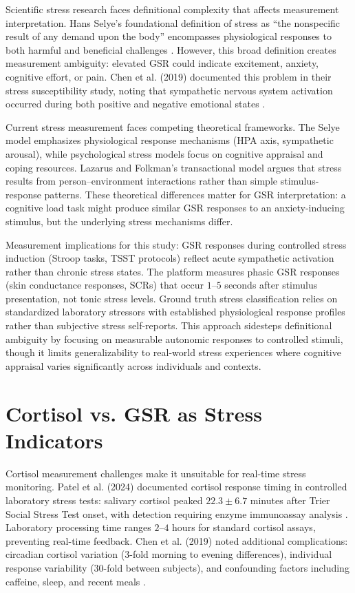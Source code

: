 \documentclass{report}
\begin{document}
Scientific stress research faces definitional complexity that affects measurement interpretation. Hans Selye's foundational definition of stress as ``the nonspecific result of any demand upon the body'' encompasses physiological responses to both harmful and beneficial challenges \cite{selye11}. However, this broad definition creates measurement ambiguity: elevated GSR could indicate excitement, anxiety, cognitive effort, or pain. Chen et al. (2019) documented this problem in their stress susceptibility study, noting that sympathetic nervous system activation occurred during both positive and negative emotional states \cite{chen2019}.

Current stress measurement faces competing theoretical frameworks. The Selye model emphasizes physiological response mechanisms (HPA axis, sympathetic arousal), while psychological stress models focus on cognitive appraisal and coping resources. Lazarus and Folkman's transactional model argues that stress results from person--environment interactions rather than simple stimulus-response patterns. These theoretical differences matter for GSR interpretation: a cognitive load task might produce similar GSR responses to an anxiety-inducing stimulus, but the underlying stress mechanisms differ.

Measurement implications for this study: GSR responses during controlled stress induction (Stroop tasks, TSST protocols) reflect acute sympathetic activation rather than chronic stress states. The platform measures phasic GSR responses (skin conductance responses, SCRs) that occur $1$--$5$ seconds after stimulus presentation, not tonic stress levels. Ground truth stress classification relies on standardized laboratory stressors with established physiological response profiles rather than subjective stress self-reports. This approach sidesteps definitional ambiguity by focusing on measurable autonomic responses to controlled stimuli, though it limits generalizability to real-world stress experiences where cognitive appraisal varies significantly across individuals and contexts.


\section{Cortisol vs. GSR as Stress Indicators}
\label{sec:cortisol_vs_gsr}

Cortisol measurement challenges make it unsuitable for real-time stress monitoring. Patel et al. (2024) documented cortisol response timing in controlled laboratory stress tests: salivary cortisol peaked $22.3 \pm 6.7$ minutes after Trier Social Stress Test onset, with detection requiring enzyme immunoassay analysis \cite{patel2024}. Laboratory processing time ranges $2$--$4$ hours for standard cortisol assays, preventing real-time feedback. Chen et al. (2019) noted additional complications: circadian cortisol variation ($3$-fold morning to evening differences), individual response variability ($30$-fold between subjects), and confounding factors including caffeine, sleep, and recent meals \cite{chen2019}.
\end{document}

